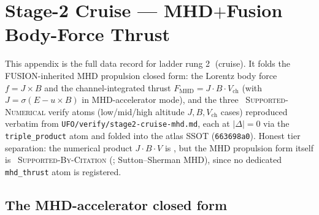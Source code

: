 \section{Stage-2 Cruise --- MHD$+$Fusion Body-Force Thrust}
\label{app:stage2}

This appendix is the full data record for ladder rung
\textcircled{\scriptsize 2} (cruise). It folds the FUSION-inherited MHD
propulsion closed form: the Lorentz body force $f=J\!\times\!B$ and the
channel-integrated thrust $F_{\text{MHD}}=J\!\cdot\!B\!\cdot\!V_{\text{ch}}$
(with $J=\sigma(E-u\!\times\!B)$ in MHD-accelerator mode), and the three
\tierGreen\ \textsc{Supported-Numerical} verify atoms (low/mid/high
altitude $J,B,V_{\text{ch}}$ cases) reproduced verbatim from
\texttt{UFO/verify/stage2-cruise-mhd.md}, each at $|\Delta|=0$ via the
\verb|triple_product| atom and folded into the atlas SSOT
(\texttt{663698a0}). Honest tier separation: the numerical product
$J\!\cdot\!B\!\cdot\!V$ is \tierGreen, but the MHD propulsion form
itself is \tierYellow\ \textsc{Supported-By-Citation}
(\citep{wesson2011tokamaks,jackson1998}; Sutton--Sherman MHD), since no
dedicated \verb|mhd_thrust| atom is registered.

\subsection{The MHD-accelerator closed form}
\label{app:stage2-deriv}


